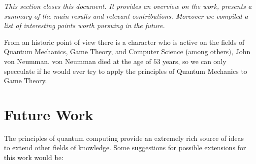\label{cap:conclusions}

\textit{This section closes this document. It provides an overview on the work, presents a summary of the main results and relevant contributions. Moreover we compiled a list of interesting points worth pursuing in the future.}

From an historic point of view there is a character who is active on the fields of Quantum Mechanics, Game Theory, and Computer Science (among others), John von Neumman. von Neumman died at the age of $53$ years, so we can only specculate if he would ever try to apply the principles of Quantum Mechanics to Game Theory. 




\section{Future Work}
\label{sec:5FutureWork}

The principles of quantum computing provide an extremely rich source of ideas to extend other fields of knowledge.
Some suggestions for possible extensions for this work would be:

